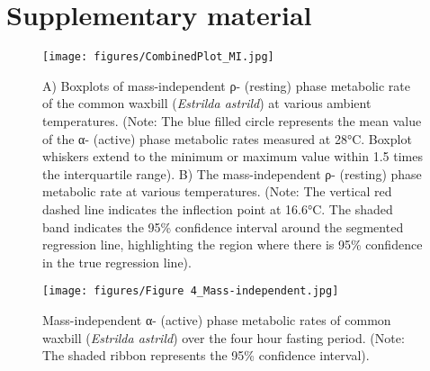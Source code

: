 \documentclass[10pt, twoside]{book} %
\newlength{\thumbheight}
\newlength{\thumbwidth}
\begin{document}
\section{Supplementary material}

\renewcommand{\thefigure}{3.\arabic{figure}}
	\begin{figure}[h!]
		\begin{center}
\small
			\texttt{[image: figures/CombinedPlot\_MI.jpg]}
		\end{center}
		\begin{footnotesize}
			\caption{\footnotesize A) Boxplots of mass-independent ρ- (resting) phase metabolic rate of the common waxbill (\textit{Estrilda astrild}) at various ambient temperatures. (Note: The blue filled circle represents the mean value of the α- (active) phase metabolic rates measured at 28°C. Boxplot whiskers extend to the minimum or maximum value within 1.5 times the interquartile range). B) The mass-independent ρ- (resting) phase metabolic rate at various temperatures. (Note: The vertical red dashed line indicates the inflection point at 16.6°C. The shaded band indicates the 95\% confidence interval around the segmented regression line, highlighting the region where there is 95\% confidence in the true regression line).\label{fig4.1}}
		\end{footnotesize}
	\end{figure}
\clearpage

\clearpage
\renewcommand{\thefigure}{3.\arabic{figure}}
	\begin{figure}[h!]
		\begin{center}
\small
			\texttt{[image: figures/Figure 4\_Mass-independent.jpg]}
		\end{center}
		\begin{footnotesize}
			\caption{\footnotesize Mass-independent α- (active) phase metabolic rates of common waxbill (\textit{Estrilda astrild}) over the four hour fasting period. (Note: The shaded ribbon represents the 95\% confidence interval).\label{fig4.1}}
		\end{footnotesize}
	\end{figure}











\setlength{\thumbwidth}{0.8cm}
\setlength{\thumbheight}{1cm}
\pagestyle{mainmatter}
\renewcommand\thesection{\arabic{chapter}.\arabic{section}}
\renewcommand{\thefigure}{\arabic{chapter}.\arabic{figure}}
\end{document}
